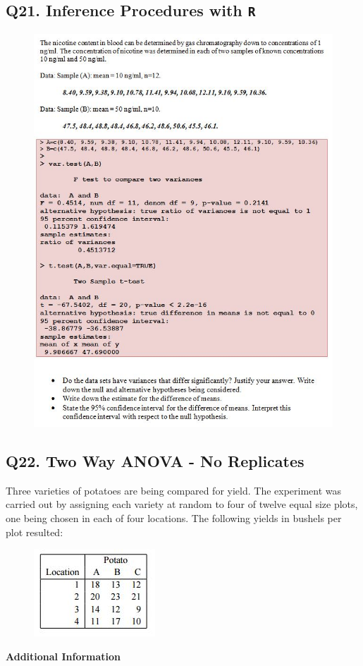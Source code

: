 \documentclass[a4paper,12pt]{article}
\begin{document}
\subsection*{Q21. Inference Procedures with \texttt{R}} %
\begin{figure}[h!]
\centering
\includegraphics[width=0.95\linewidth]{image/Q21review}

\end{figure}
\newpage
\subsection*{Q22. Two Way ANOVA - No Replicates} %

Three varieties of potatoes are being compared for yield. The experiment
was carried out by assigning each variety at random to four of twelve equal size
plots, one being chosen in each of four locations. The following yields in bushels per 
plot resulted:

\begin{figure}[h!]
	\centering
	\includegraphics[width=0.4\linewidth]{twowayanova-potato}
\end{figure}
\noindent \textbf{Additional Information} 
\end{document}

